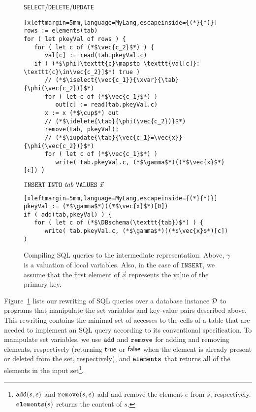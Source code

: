 \begin{figure}[t]
\small
\begin{flushleft}
\texttt{SELECT}/\texttt{DELETE}/\texttt{UPDATE}
\end{flushleft}
\vspace{-2mm}
\begin{lstlisting}[xleftmargin=5mm,language=MyLang,escapeinside={(*}{*)}]
rows := elements(tab)
for ( let pkeyVal of rows ) {
   for ( let c of (*$\vec{c_2}$*) ) {
      val[c] := read(tab.pkeyVal.c)
   if ( (*$\phi[\texttt{c}\mapsto \texttt{val[c]}: \texttt{c}\in\vec{c_2}]$*) true )
      // (*$\iselect{\vec{c_1}}{\xvar}{\tab}{\phi(\vec{c_2})}$*)
      for ( let c of (*$\vec{c_1}$*) )
         out[c] := read(tab.pkeyVal.c)
      x := x (*$\cup$*) out
      // (*$\idelete{\tab}{\phi(\vec{c_2})}$*)
      remove(tab, pkeyVal);
      // (*$\iupdate{\tab}{\vec{c_1}=\vec{x}}{\phi(\vec{c_2})}$*)
      for ( let c of (*$\vec{c_1}$*) )
         write( tab.pkeyVal.c, (*$\gamma$*)((*$\vec{x}$*)[c]) )
\end{lstlisting}

\begin{flushleft}
$\mathtt{INSERT\ INTO}\ {\mathit{tab}}\ \mathtt{VALUES}\ {\vec{x}}$
\end{flushleft}
\vspace{-2mm}
\begin{lstlisting}[xleftmargin=5mm,language=MyLang,escapeinside={(*}{*)}]
pkeyVal := (*$\gamma$*)((*$\vec{x}$*)[0])
if ( add(tab,pkeyVal) ) {
   for ( let c of (*$\DBschema(\texttt{tab})$*) ) {
      write( tab.pkeyVal.c, (*$\gamma$*)((*$\vec{x}$*)[c]) )
\end{lstlisting}
\vspace{-4mm}
    \caption{Compiling SQL queries to the intermediate representation. Above, $\gamma$ is a valuation of local variables. Also, in the case of $\mathtt{INSERT}$, we assume that the first element of $\vec{x}$ represents the value of the primary key.}
    \label{fig:sql-ir}
\vspace{-3mm}
\end{figure}

Figure~\ref{fig:sql-ir} lists our rewriting of SQL queries over a database instance $\mathcal{D}$ to programs that manipulate the set variables and key-value pairs described above. This rewriting contains the minimal set of accesses to the cells of a table that are needed to implement an SQL query according to its conventional specification. To manipulate set variables, we use $\mathtt{add}$ and $\mathtt{remove}$ for adding and removing elements, respectively (returning $\mathsf{true}$ or $\mathsf{false}$ when the element is already present or deleted from the set, respectively), and $\mathtt{elements}$ that returns all of the elements in the input set\footnote{$\mathtt{add}(s,e)$ and $\mathtt{remove}(s,e)$ add and remove the element $e$ from $s$, respectively. $\mathtt{elements}(s)$ returns the content of $s$.}. 

